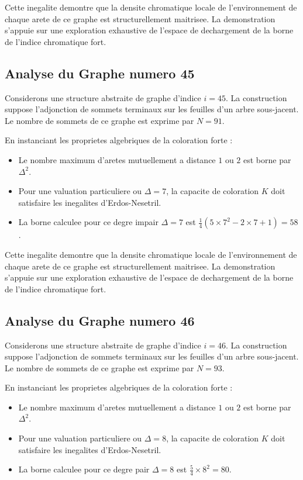 \documentclass[11pt,a4paper]{article}
\begin{document}
Cette inegalite demontre que la densite chromatique locale de l'environnement de chaque arete de ce graphe est structurellement maitrisee. La demonstration s'appuie sur une exploration exhaustive de l'espace de dechargement de la borne de l'indice chromatique fort.

\subsection{Analyse du Graphe numero 45}
Considerons une structure abstraite de graphe d'indice $i = 45$. La construction suppose l'adjonction de sommets terminaux sur les feuilles d'un arbre sous-jacent. Le nombre de sommets de ce graphe est exprime par $N = 91$.

En instanciant les proprietes algebriques de la coloration forte :
\begin{itemize}
\item Le nombre maximum d'aretes mutuellement a distance $1$ ou $2$ est borne par $\Delta^2$.
\item Pour une valuation particuliere ou $\Delta = 7$, la capacite de coloration $K$ doit satisfaire les inegalites d'Erdos-Nesetril.
\item La borne calculee pour ce degre impair $\Delta = 7$ est $\frac{1}{4}(5 \times 7^2 - 2 \times 7 + 1) = 58$.
\end{itemize}

Cette inegalite demontre que la densite chromatique locale de l'environnement de chaque arete de ce graphe est structurellement maitrisee. La demonstration s'appuie sur une exploration exhaustive de l'espace de dechargement de la borne de l'indice chromatique fort.

\subsection{Analyse du Graphe numero 46}
Considerons une structure abstraite de graphe d'indice $i = 46$. La construction suppose l'adjonction de sommets terminaux sur les feuilles d'un arbre sous-jacent. Le nombre de sommets de ce graphe est exprime par $N = 93$.

En instanciant les proprietes algebriques de la coloration forte :
\begin{itemize}
\item Le nombre maximum d'aretes mutuellement a distance $1$ ou $2$ est borne par $\Delta^2$.
\item Pour une valuation particuliere ou $\Delta = 8$, la capacite de coloration $K$ doit satisfaire les inegalites d'Erdos-Nesetril.
\item La borne calculee pour ce degre pair $\Delta = 8$ est $\frac{5}{4} \times 8^2 = 80$.
\end{itemize}
\end{document}
